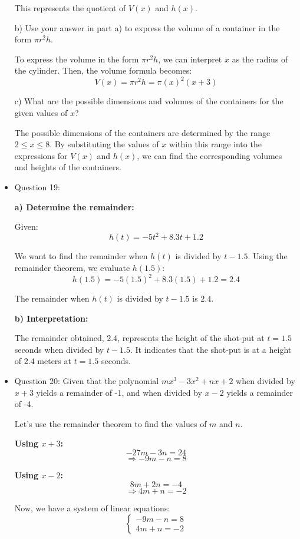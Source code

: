 \documentclass{article}
\begin{document}
\begin{itemize}
This represents the quotient of \(V(x)\) and \(h(x)\). 

b) Use your answer in part a) to express the volume of a container in the form \(\pi r^2h\).

To express the volume in the form \(\pi r^2h\), we can interpret \(x\) as the radius of the cylinder. Then, the volume formula becomes:
\[
V(x) = \pi r^2 h = \pi (x)^2 (x + 3)
\]

c) What are the possible dimensions and volumes of the containers for the given values of \(x\)?

The possible dimensions of the containers are determined by the range \(2 \leq x \leq 8\). By substituting the values of \(x\) within this range into the expressions for \(V(x)\) and \(h(x)\), we can find the corresponding volumes and heights of the containers.



\item Question 19:

\textbf{a) Determine the remainder:}

Given:
\[ h(t) = -5t^2 + 8.3t + 1.2 \]

We want to find the remainder when \( h(t) \) is divided by \( t - 1.5 \). Using the remainder theorem, we evaluate \( h(1.5) \):
\[ h(1.5) = -5(1.5)^2 + 8.3(1.5) + 1.2 = 2.4 \]

The remainder when \( h(t) \) is divided by \( t - 1.5 \) is \( 2.4 \).

\textbf{b) Interpretation:}

The remainder obtained, \( 2.4 \), represents the height of the shot-put at \( t = 1.5 \) seconds when divided by \( t - 1.5 \). It indicates that the shot-put is at a height of \( 2.4 \) meters at \( t = 1.5 \) seconds.


    \item Question 20:
    Given that the polynomial $mx^3 - 3x^2 + nx + 2$ when divided by $x + 3$ yields a remainder of -1, and when divided by $x - 2$ yields a remainder of -4.
    
    Let's use the remainder theorem to find the values of $m$ and $n$.
    
    \textbf{Using $x + 3$:}
    \[ -27m - 3n = 24 \]
    \[ \Rightarrow -9m - n = 8 \]
    
    \textbf{Using $x - 2$:}
    \[ 8m + 2n = -4 \]
    \[ \Rightarrow 4m + n = -2 \]
    
    Now, we have a system of linear equations:
    \[ 
    \begin{cases}
    -9m - n = 8 \\
    4m + n = -2
    \end{cases}
    \]
    

\end{itemize}
\end{document}
